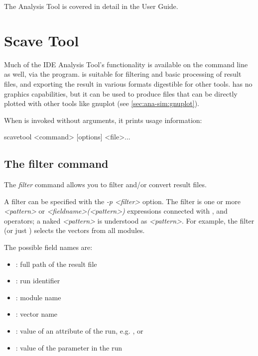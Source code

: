 The Analysis Tool is covered in detail in the User Guide.


\section{Scave Tool}
\label{sec:ana-sim:scavetool}

Much of the IDE Analysis Tool's functionality is available on the command
line as well, via the  program.  is
suitable for filtering and basic processing of result files, and
exporting the result in various formats digestible for other tools.
 has no graphics capabilities, but it can be used
to produce files that can be directly plotted with other tools like
gnuplot (see \ref{sec:ana-sim:gnuplot}).

When  is invoked without arguments, it prints usage information:

\begin{commandline}
scavetool <command> [options] <file>...
\end{commandline}

\subsection{The filter command}

The \textit{filter} command allows you to filter and/or convert result files.

A filter can be specified with the \textit{-p <filter>} option.
The filter is one or more \textit{<pattern>} or \textit{<fieldname>(<pattern>)}
expressions connected with ,  and  operators;
a naked \textit{<pattern>} is understood as \textit{<pattern>}\ttt{)}.
For example, the filter  (or just
) selects the  vectors from all
 modules.

The possible field names are:

\begin{itemize}
    \item{}: full path of the result file
    \item{}: run identifier
    \item{}: module name
    \item{}: vector name
    \item{}: value of an attribute of the run,
        e.g. ,  or 
    \item{}: value of the parameter in the run
\end{itemize}

